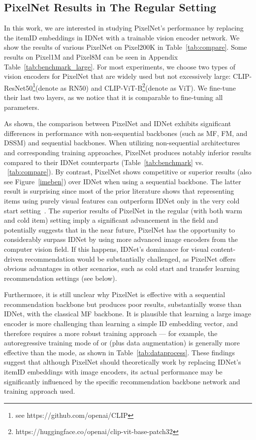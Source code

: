 \documentclass[sigconf]{acmart}
\begin{document}
\subsection{PixelNet Results in The Regular Setting}
In this work, we are interested in studying PixelNet's performance by replacing the itemID embeddings in IDNet with a trainable vision encoder network.
We show the results of various PixelNet on Pixel200K  in Table~\ref{tab:compare}.  Some  results on Pixel1M and Pixel8M can be seen in Appendix Table~\ref{tab:benchmark_large}. 
For most experiments, we choose  two types of vision encoders for PixelNet that are widely used but not excessively large:  CLIP-ResNet50\footnote{see https://github.com/openai/CLIP}(denote as RN50) and CLIP-ViT-B\footnote{https://huggingface.co/openai/clip-vit-base-patch32}(denote as ViT).
We fine-tune their last two layers, as we notice that it is comparable to fine-tuning all parameters.

As shown, the comparison between PixelNet and IDNet exhibits significant differences in performance with non-sequential backbones (such as MF, FM, and DSSM) and sequential backbones. When utilizing  non-sequential architectures and corresponding training approaches,  PixelNet produces notably inferior results compared to their IDNet counterparts (Table~\ref{tab:benchmark} vs. ~\ref{tab:compare}). By contrast,  PixelNet shows  competitive or superior results (also see Figure~\ref{imeben}) over  IDNet when  using a sequential backbone.
The latter result is   surprising since  most of the prior literature shows that representing items  using purely visual features can outperform IDNet only in the very cold start setting~\cite{yuan2023go,du2020learn}. 
The superior results of PixelNet in the regular (with both warm and cold item) setting imply a significant advancement in the field  and potentially suggests that in the near future, PixelNet has the opportunity to considerably surpass IDNet by using more advanced image encoders from the computer vision field. If this happens, IDNet's dominance for visual content-driven recommendation would be substantially challenged, as PixelNet offers obvious advantages in other  scenarios, such as cold start and transfer learning recommendation settings (see below).

Furthermore, it is still unclear why PixelNet is effective with a sequential recommendation backbone but produces poor results, substantially worse than IDNet, with the classical MF backbone. It is plausible that learning a large image encoder is more challenging than learning a simple ID embedding vector, and therefore requires a more robust training approach --- for example, the autoregressive training mode of  or  (plus data augmentation) is generally  more effective than  the  mode, as shown in Table~\ref{tab:dataprocess}. These findings suggest that although PixelNet should theoretically work by replacing IDNet's itemID embeddings with image encoders, its actual performance may be significantly influenced by the specific recommendation backbone network and training approach used. 
 
\end{document}
